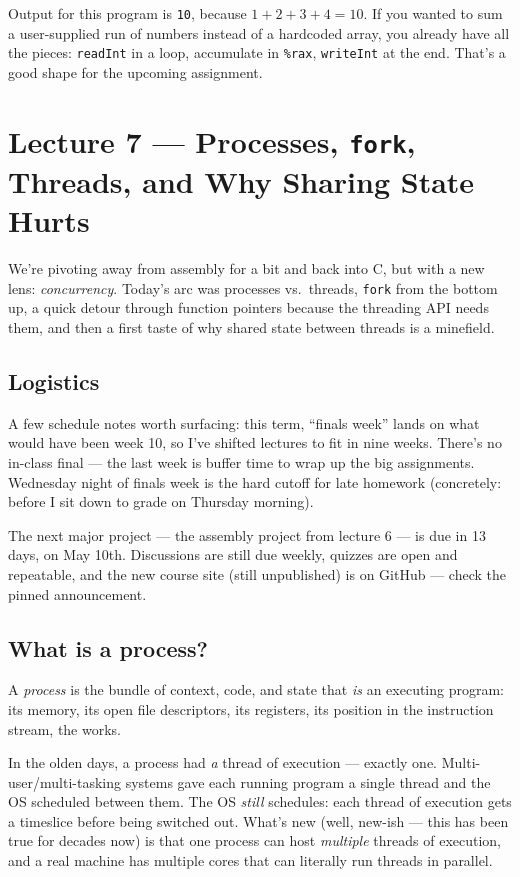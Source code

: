 \documentclass[11pt]{article}
\begin{document}
Output for this program is \texttt{10}, because $1+2+3+4=10$. If you
wanted to sum a user-supplied run of numbers instead of a hardcoded
array, you already have all the pieces: \texttt{readInt} in a loop,
accumulate in \texttt{\%rax}, \texttt{writeInt} at the end. That's a
good shape for the upcoming assignment.

\section{Lecture 7 --- Processes, \texttt{fork}, Threads, and Why Sharing State Hurts}

We're pivoting away from assembly for a bit and back into C, but with
a new lens: \emph{concurrency}. Today's arc was processes vs.\ threads,
\texttt{fork} from the bottom up, a quick detour through function
pointers because the threading API needs them, and then a first taste
of why shared state between threads is a minefield.

\subsection*{Logistics}

A few schedule notes worth surfacing: this term, ``finals week'' lands
on what would have been week 10, so I've shifted lectures to fit in
nine weeks. There's no in-class final --- the last week is buffer time
to wrap up the big assignments. Wednesday night of finals week is the
hard cutoff for late homework (concretely: before I sit down to grade
on Thursday morning).

The next major project --- the assembly project from lecture 6 --- is
due in 13 days, on May 10th. Discussions are still due weekly,
quizzes are open and repeatable, and the new course site (still
unpublished) is on GitHub --- check the pinned announcement.

\subsection*{What is a process?}

A \emph{process} is the bundle of context, code, and state that
\emph{is} an executing program: its memory, its open file descriptors,
its registers, its position in the instruction stream, the works.

In the olden days, a process had \emph{a} thread of execution ---
exactly one. Multi-user/multi-tasking systems gave each running
program a single thread and the OS scheduled between them. The OS
\emph{still} schedules: each thread of execution gets a timeslice
before being switched out. What's new (well, new-ish --- this has been
true for decades now) is that one process can host \emph{multiple}
threads of execution, and a real machine has multiple cores that can
literally run threads in parallel.
\end{document}
